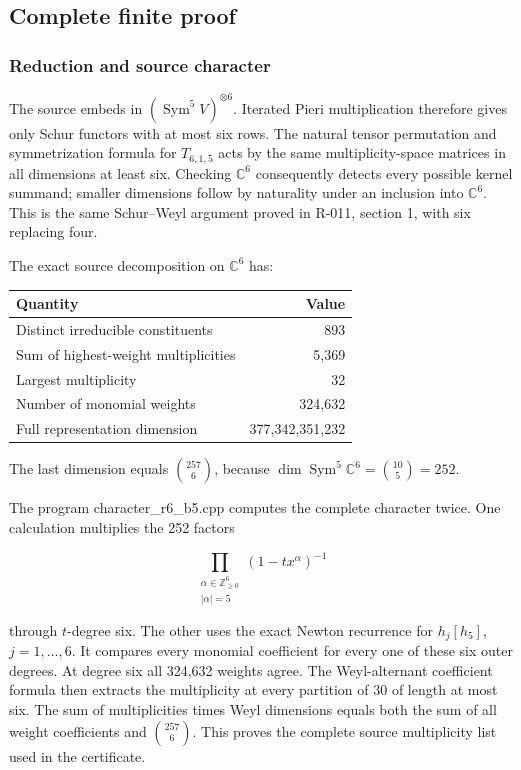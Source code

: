 \documentclass[
  10pt,
]{article}
\begin{document}
\subsection{Complete finite proof}\label{complete-finite-proof}

\subsubsection{Reduction and source
character}\label{reduction-and-source-character}

The source embeds in \((\operatorname{Sym}^5V)^{\otimes6}\). Iterated
Pieri multiplication therefore gives only Schur functors with at most
six rows. The natural tensor permutation and symmetrization formula for
\(T_{6,1,5}\) acts by the same multiplicity-space matrices in all
dimensions at least six. Checking \(\mathbb C^6\) consequently detects
every possible kernel summand; smaller dimensions follow by naturality
under an inclusion into \(\mathbb C^6\). This is the same Schur--Weyl
argument proved in R-011, section 1, with six replacing four.

The exact source decomposition on \(\mathbb C^6\) has:

\begin{longtable}[]{@{}lr@{}}
\toprule\noalign{}
Quantity & Value \\
\midrule\noalign{}
\endhead
\bottomrule\noalign{}
\endlastfoot
Distinct irreducible constituents & 893 \\
Sum of highest-weight multiplicities & 5,369 \\
Largest multiplicity & 32 \\
Number of monomial weights & 324,632 \\
Full representation dimension & 377,342,351,232 \\
\end{longtable}

The last dimension equals \(\binom{257}{6}\), because
\(\dim\operatorname{Sym}^5\mathbb C^6=\binom{10}{5}=252\).

The program character\_r6\_b5.cpp computes the complete character twice.
One calculation multiplies the 252 factors

\[
 \prod_{\substack{\alpha\in\mathbb Z_{\ge0}^6\\|\alpha|=5}}
       (1-tx^\alpha)^{-1}
\]

through \(t\)-degree six. The other uses the exact Newton recurrence for
\(h_j[h_5]\), \(j=1,\ldots,6\). It compares every monomial coefficient
for every one of these six outer degrees. At degree six all 324,632
weights agree. The Weyl-alternant coefficient formula then extracts the
multiplicity at every partition of 30 of length at most six. The sum of
multiplicities times Weyl dimensions equals both the sum of all weight
coefficients and \(\binom{257}{6}\). This proves the complete source
multiplicity list used in the certificate.
\end{document}
